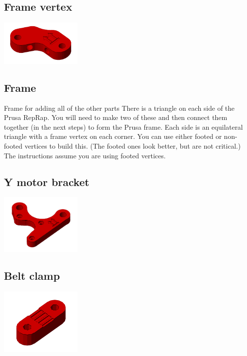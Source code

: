 \documentclass[11pt]{article}
\begin{document}
\hypertarget{thing_frame-vertex}{\subsection{Frame vertex}}
\includegraphics[width=4cm]{images/frame-vertex.png}

\hypertarget{thing_frame}{\subsection{Frame}}
Frame for adding all of the other parts
There is a triangle on each side of the Prusa RepRap. You will need to make two of these and then connect them together (in the next steps) to form the Prusa frame. Each side is an equilateral triangle with a frame vertex on each corner. You can use either footed or non-footed vertices to build this. (The footed ones look better, but are not critical.) The instructions assume you are using footed vertices.

\hypertarget{thing_y-motor-bracket}{\subsection{Y motor bracket}}
\includegraphics[width=4cm]{images/y-motor-bracket.png}

\hypertarget{thing_belt-clamp}{\subsection{Belt clamp}}
\includegraphics[width=4cm]{images/belt-clamp.png}
\end{document}
